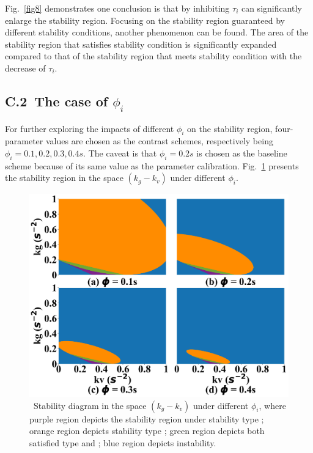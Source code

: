 \documentclass[a4paper]{cas-sc}
\begin{document}
Fig.~\ref{fig8} demonstrates one conclusion is that by inhibiting $\tau_i$ can significantly enlarge the stability region. Focusing on the stability region guaranteed by different stability conditions, another phenomenon can be found. The area of the stability region that satisfies stability condition \uppercase\expandafter{} is significantly expanded compared to that of the stability region that meets stability condition \uppercase\expandafter{} with the decrease of $\tau_i$.

\subsection*{C.2~The case of $\phi_i$}

For further exploring the impacts of different $\phi_i$ on the stability region, four-parameter values are chosen as the contrast schemes, respectively being $\phi_i=0.1,0.2,0.3,0.4s$. The caveat is that $\phi_i=0.2s$ is chosen as the baseline scheme because of its same value as the parameter calibration. Fig.~\ref{fig9} presents the stability region in the space $(k_g-k_v)$ under different $\phi_i$.

\begin{figure}
  \centering
  \includegraphics[width=14cm]{figs/fig9.png}
  \caption{~Stability diagram in the space $(k_g-k_v)$ under different $\phi_i$, where purple region depicts the stability region under stability type \uppercase\expandafter{}; orange region depicts stability type \uppercase\expandafter{}; green region depicts both satisfied type \uppercase\expandafter{} and \uppercase\expandafter{}; blue region depicts instability.}
  \label{fig9}
\end{figure}
\end{document}
